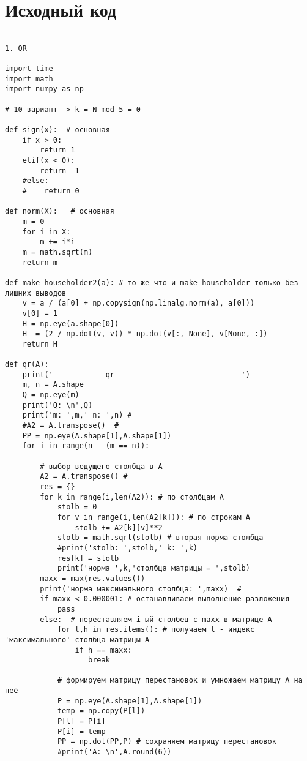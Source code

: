 \documentclass[13pt,a4paper]{scrartcl}
\begin{document}
\section{Исходный код}
\begin{verbatim}

1. QR

import time
import math
import numpy as np

# 10 вариант -> k = N mod 5 = 0

def sign(x):  # основная
    if x > 0:
        return 1
    elif(x < 0):
        return -1
    #else:
    #    return 0

def norm(X):   # основная
    m = 0
    for i in X:
        m += i*i  
    m = math.sqrt(m)
    return m
 
def make_householder2(a): # то же что и make_householder только без лишних выводов
    v = a / (a[0] + np.copysign(np.linalg.norm(a), a[0]))
    v[0] = 1
    H = np.eye(a.shape[0])
    H -= (2 / np.dot(v, v)) * np.dot(v[:, None], v[None, :])
    return H

def qr(A):
    print('----------- qr ----------------------------')
    m, n = A.shape
    Q = np.eye(m)
    print('Q: \n',Q)
    print('m: ',m,' n: ',n) #
    #A2 = A.transpose()  #
    PP = np.eye(A.shape[1],A.shape[1])
    for i in range(n - (m == n)):

        # выбор ведущего столбца в A
        A2 = A.transpose() #
        res = {}
        for k in range(i,len(A2)): # по столбцам A
            stolb = 0 
            for v in range(i,len(A2[k])): # по строкам A
                stolb += A2[k][v]**2
            stolb = math.sqrt(stolb) # вторая норма столбца
            #print('stolb: ',stolb,' k: ',k)
            res[k] = stolb
            print('норма ',k,'столбца матрицы = ',stolb)
        maxx = max(res.values())
        print('норма максимального столбца: ',maxx)  #    
        if maxx < 0.000001: # останавливаем выполнение разложения
            pass 
        else:  # переставляем i-ый столбец с maxx в матрице A          
            for l,h in res.items(): # получаем l - индекс 'максимального' столбца матрицы A
                if h == maxx:
                   break
            
            # формируем матрицу перестановок и умножаем матрицу A на неё
            P = np.eye(A.shape[1],A.shape[1])
            temp = np.copy(P[l])
            P[l] = P[i]
            P[i] = temp     
            PP = np.dot(PP,P) # сохраняем матрицу перестановок
            #print('A: \n',A.round(6))


\end{verbatim}
\end{document}
